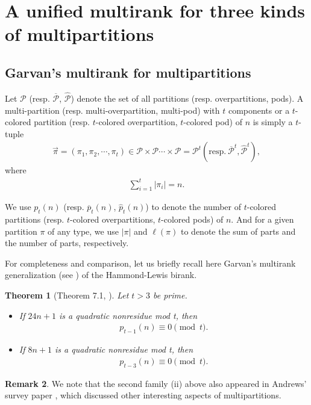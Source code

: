 \documentclass[12pt]{amsart}
\numberwithin{equation}{section}
\theoremstyle{plain}
\newtheorem{theorem}{Theorem}[section]
\theoremstyle{definition}
\newtheorem{remark}[theorem]{Remark}
\begin{document}
\section{A unified multirank for three kinds of multipartitions}\label{sec:over and pod}

\subsection{Garvan's multirank for multipartitions}
Let $\mathcal{P}$ (resp. $\mathcal{\overline{P}}$, $\mathcal{\hat{P}}$) denote the set of all partitions (resp. overpartitions, pods). A multi-partition (resp. multi-overpartition, multi-pod) with $t$ components or a $t$-colored partition (resp. $t$-colored overpartition, $t$-colored pod) of $n$ is simply a $t$-tuple
\begin{align*}
\overrightarrow{\pi}=(\pi_{1},\pi_{2},\cdots,\pi_{t})\in\mathcal{P}\times\mathcal{P}\cdots\times\mathcal{P}
=\mathcal{P}^{t} (\textrm{resp}.~\mathcal{\overline{P}}^{t}, \mathcal{\hat{P}}^t),
\end{align*}
where
\begin{align*}
\sum_{i=1}^{t}|\pi_{i}|=n.
\end{align*}

We use $p_t(n)$ (resp. $\overline{p}_t(n)$, $\hat{p}_t(n)$) to denote the number of $t$-colored partitions (resp. $t$-colored overpartitions, $t$-colored pods) of $n$. And for a given partition $\pi$ of any type, we use $|\pi|$ and $\ell(\pi)$ to denote the sum of parts and the number of parts, respectively.

For completeness and comparison, let us briefly recall here Garvan's multirank generalization (see \cite{Gar2}) of the Hammond-Lewis birank.

\begin{theorem}[Theorem 7.1, \cite{Gar2}]\label{Gmulti}
Let $t>3$ be prime.
\begin{itemize}
\item[(i)] If $24n+1$ is a quadratic nonresidue mod t, then
\begin{align*}
p_{t-1}(n)\equiv 0 \pmod{t}.
\end{align*}
\item[(ii)] If $8n+1$ is a quadratic nonresidue mod t, then
\begin{align*}
p_{t-3}(n)\equiv 0 \pmod{t}.
\end{align*}
\end{itemize}
\end{theorem}
\begin{remark}
We note that the second family (ii) above also appeared in Andrews' survey paper \cite{Andr2}, which discussed other interesting aspects of multipartitions.
\end{remark}
\end{document}
